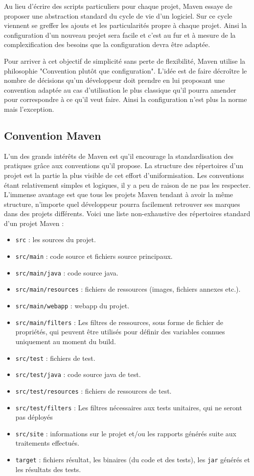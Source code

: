 \documentclass[a4paper,11pt]{article}
\begin{document}
Au lieu d'écrire des scripts particuliers pour chaque projet, Maven 
essaye de proposer une abstraction standard du cycle de vie d'un logiciel. Sur ce cycle viennent se greffer les ajouts et 
les particularités propre à chaque projet. Ainsi la configuration d'un nouveau projet sera facile et c'est au fur et à 
mesure de la complexification des besoins que la configuration devra être adaptée. 

Pour arriver à cet objectif de simplicité sans perte de flexibilité, Maven utilise la philosophie "Convention plutôt que 
configuration". L'idée est de faire décroître le nombre de décisions qu'un développeur doit prendre en lui proposant une 
convention adaptée au cas d'utilisation le plus classique qu'il pourra amender pour correspondre à ce qu'il veut faire.
Ainsi la configuration n'est plus la norme mais l'exception.

\subsection{Convention Maven}
L'un des grands intérêts de Maven est qu'il encourage la standardisation des pratiques grâce aux conventions qu'il propose.
La structure des répertoires d'un projet est la partie la plus visible de cet effort d'uniformisation. Les conventions 
étant relativement simples et logiques, il y a peu de raison de ne pas les respecter. L'immense avantage est 
que tous les projets Maven tendant à avoir la même structure, n'importe quel développeur pourra facilement retrouver 
ses marques dans des projets différents. Voici une liste non-exhaustive des répertoires standard d'un projet Maven :

\begin{itemize}
  \item\texttt{src} : les sources du projet.
  \item\texttt{src/main} : code source et fichiers source principaux.
  \item\texttt{src/main/java} : code source java.
  \item\texttt{src/main/resources} : fichiers de ressources (images, fichiers annexes etc.).
  \item\texttt{src/main/webapp} : webapp du projet.
  \item\texttt{src/main/filters} : Les filtres de ressources, sous forme de fichier de propriétés, qui peuvent être 
  utilisés pour définir des variables connues uniquement au moment du build.
  \item\texttt{src/test} : fichiers de test.
  \item\texttt{src/test/java} : code source java de test.
  \item\texttt{src/test/resources} : fichiers de ressources de test.
  \item\texttt{src/test/filters} : Les filtres nécessaires aux tests unitaires, qui ne seront pas déployés
  \item\texttt{src/site} : informations sur le projet et/ou les rapports générés suite aux traitements effectués.
  \item\texttt{target} : fichiers résultat, les binaires (du code et des tests), les \texttt{jar} générés et les 
  résultats des tests.
\end{itemize}
\end{document}
